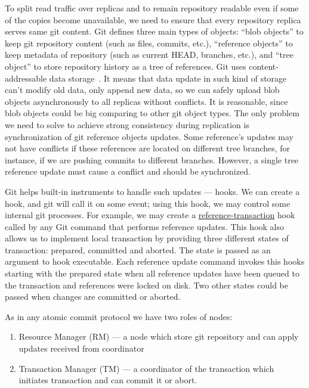 \documentclass[sigplan, screen, nonacm, 11pt]{acmart}
\begin{document}
To split read traffic over replicas and to remain repository readable even if some of the copies become unavailable,
we need to ensure that every repository replica serves same git content.
Git defines three main types of objects: ``blob objects'' to keep git repository content (such as files, commits, etc.),
``reference objects'' to keep metadata of repository (such as current HEAD, branches, etc.), and ``tree object'' to
store repository history as a tree of references. Git uses content-addressable
data storage~\cite{content-addressable-storage}.
It means that data update in such kind of storage can't modify old data, only append new data, so we can safely
upload blob objects asynchronously to all replicas without conflicts.
It is reasonable, since blob objects could be big comparing to
other git object types. The only problem we need to solve to achieve strong consistency during replication
is synchronization of git reference objects updates. Some reference's updates may not have conflicts if these references
are located on different tree branches, for instance, if we are pushing commits to different branches.
However, a single tree reference update must cause a conflict and should be synchronized.

Git helps built-in instruments to handle such updates --- hooks. We can create a hook, and git will call it on some event;
using this hook, we may control some internal git processes. For example, we may create a
\href{https://git-scm.com/docs/githooks.html\#\_reference\_transaction}{reference-transaction} hook
called by any Git command that performs reference updates. This hook also allows us to implement
local transaction by providing three different states of transaction: prepared, committed and aborted.
The state is passed as an argument to hook executable.
Each reference update command invokes this hooks starting with the prepared state when all reference updates
have been queued to the transaction and references were locked on disk. Two other states could be passed
when changes are committed or aborted.

As in any atomic commit protocol we have two roles of nodes:
\begin{enumerate}
  \item Resource Manager (RM) --- a node which store git repository and can apply updates received from coordinator
  \item Transaction Manager (TM) --- a coordinator of the transaction  which initiates transaction and can commit
    it or abort.
\end{enumerate}
\end{document}
